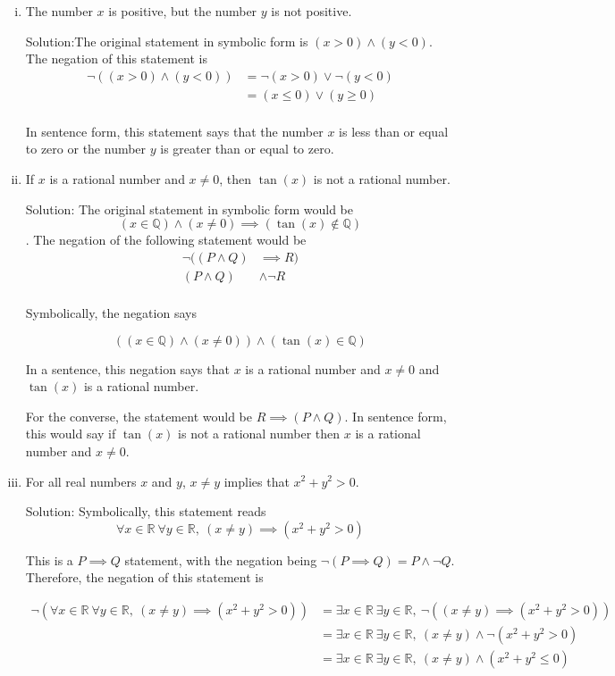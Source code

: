 \documentclass[11pt]{amsart}
\newcommand{\R}{\mathbb{R}}
\newcommand{\Q}{\mathbb{Q}}
\begin{document}
\begin{enumerate}
\begin{enumerate}[(i)]
\item The number $x$ is positive, but the number $y$ is not positive.

Solution:The original statement in symbolic form is $(x > 0) \wedge (y < 0)$. The negation of this statement is 
\begin{align*}
\neg ((x > 0) \wedge (y < 0)) &= \neg (x > 0) \vee \neg (y < 0) \\
                              &= (x \leq 0) \vee (y \geq 0) \\
\end{align*}

In sentence form, this statement says that the number $x$ is less than or equal to zero or the number $y$ is greater than or equal to zero.

\item If $x$ is a rational number and $x\neq 0$, then $\tan(x)$ is not a rational number.

Solution: The original statement in symbolic form would be $$(x \in \Q) \wedge (x \neq 0) \implies (\tan(x) \notin \Q)$$. The negation of the following statement would be 
\begin{align*}
    \neg((P \wedge Q)&\implies R)\\
    (P \wedge Q) & \wedge \neg R\\
\end{align*}


Symbolically, the negation says 

\[
    ((x \in \Q) \wedge (x \neq 0)) \wedge ( \tan(x) \in \Q)
\]

In a sentence, this negation says that $x$ is a rational number and $ x \neq 0 $ and $\tan(x)$ is a rational number. 

For the converse, the statement would be $ R \implies ( P \wedge Q) $. In sentence form, this would say if $\tan(x)$ is not a rational number then $x$ is a rational number and $x \neq 0$.

\item For all real numbers $x$ and $y$, $x\neq y$ implies that $x^2+y^2>0$.

Solution: Symbolically, this statement reads
\[ \forall x \in \R \ \forall y \in \R, \ (x \neq y) \implies (x^2 + y^2 > 0) \]

This is a $ P \implies Q$ statement, with the negation being $\neg (P \implies Q) = P \wedge \neg Q$. Therefore, the negation of this statement is

\begin{align*}
    \neg (\forall x \in \R \ \forall y \in \R, \ (x \neq y) \implies (x^2 + y^2 > 0)) &= \exists x \in \R \ \exists y \in \R, \ \neg ( (x \neq y) \implies (x^2 + y^2 > 0)) \\
    &= \exists x \in \R \ \exists y \in \R, \ (x \neq y) \wedge \neg(x^2 + y^2 > 0) \\
    &= \exists x \in \R \ \exists y \in \R, \ (x \neq y) \wedge (x^2 + y^2 \leq 0)
\end{align*}


\end{enumerate}
\end{enumerate}
\end{document}
